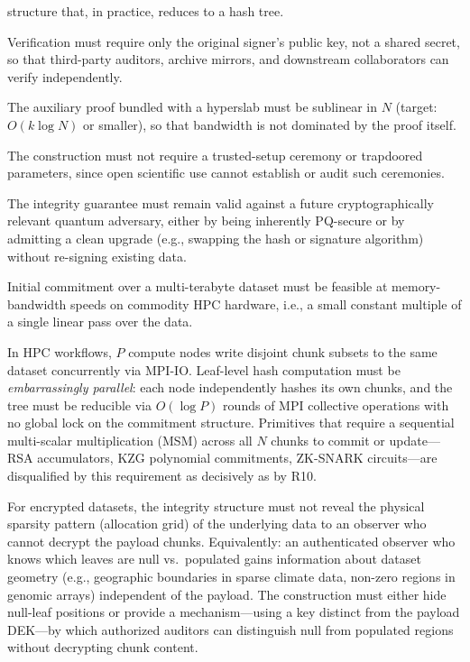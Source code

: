 \documentclass[11pt]{article}
\begin{document}
\begin{description}[nosep]
    structure that, in practice, reduces to a hash tree.
  \item[R6: Public verifiability.]
    Verification must require only the original signer's public key, not a
    shared secret, so that third-party auditors, archive mirrors, and
    downstream collaborators can verify independently.
  \item[R7: Compact subset proof.]
    The auxiliary proof bundled with a hyperslab must be sublinear in $N$
    (target: $O(k\log N)$ or smaller), so that bandwidth is not dominated
    by the proof itself.
  \item[R8: No trusted setup.]
    The construction must not require a trusted-setup ceremony or trapdoored
    parameters, since open scientific use cannot establish or audit such
    ceremonies.
  \item[R9: Post-quantum upgrade path.]
    The integrity guarantee must remain valid against a future
    cryptographically relevant quantum adversary, either by being inherently
    PQ-secure or by admitting a clean upgrade (e.g., swapping the hash or
    signature algorithm) without re-signing existing data.
  \item[R10: HPC-feasible build cost.]
    Initial commitment over a multi-terabyte dataset must be feasible at
    memory-bandwidth speeds on commodity HPC hardware, i.e., a small
    constant multiple of a single linear pass over the data.
  \item[R11: Distributed parallel construction.]
    In HPC workflows, $P$ compute nodes write disjoint chunk subsets to the
    same dataset concurrently via MPI-IO. Leaf-level hash computation must be
    \emph{embarrassingly parallel}: each node independently hashes its own
    chunks, and the tree must be reducible via $O(\log P)$ rounds of MPI
    collective operations with no global lock on the commitment structure.
    Primitives that require a sequential multi-scalar multiplication (MSM)
    across all $N$ chunks to commit or update---RSA accumulators, KZG
    polynomial commitments, ZK-SNARK circuits---are disqualified by this
    requirement as decisively as by R10.
  \item[R12: Structure confidentiality for sparse encrypted datasets.]
    For encrypted datasets, the integrity structure must not reveal the
    physical sparsity pattern (allocation grid) of the underlying data to an
    observer who cannot decrypt the payload chunks. Equivalently: an
    authenticated observer who knows which leaves are null vs.\ populated
    gains information about dataset geometry (e.g., geographic boundaries in
    sparse climate data, non-zero regions in genomic arrays) independent of
    the payload. The construction must either hide null-leaf positions or
    provide a mechanism---using a key distinct from the payload DEK---by which
    authorized auditors can distinguish null from populated regions without
    decrypting chunk content.
\end{description}
\end{document}
